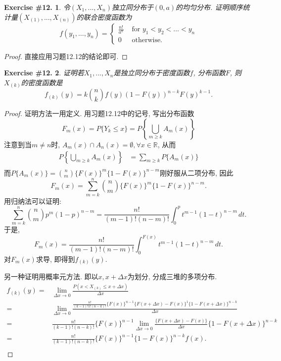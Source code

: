 \documentclass[UTF8, a4paper]{article}
\newtheorem{exercise}{Exercise \#12.}
\begin{document}
\begin{framed}
\begin{exercise}
令\((X_1, ..., X_n)\)独立同分布于\((0,a)\)的均匀分布.
证明顺序统计量\((X_{(1)}, ..., X_{(n)})\)的联合密度函数为
$$
f\left(y_1, \ldots, y_n\right)= \begin{cases}\frac{n!}{a^n} & \text { for } y_1<y_2<\ldots<y_n \\ 0 & \text { otherwise. }\end{cases}
$$
\end{exercise}
\end{framed}

\begin{proof}
直接应用习题12.12的结论即可.
\end{proof}



\begin{framed}
\begin{exercise}
证明若\(X_1, ..., X_n\)是独立同分布于密度函数\(f\), 分布函数\(F\), 则\(X_{(k)}\)的密度函数是
$$
f_{(k)}(y)=k\binom{n}{k} f(y)(1-F(y))^{n-k} F(y)^{k-1}.
$$
\end{exercise}
\end{framed}

\begin{proof}
证明方法一用定义. 用习题12.12中的记号, 写出分布函数
$$
F_m(x) = P\{Y_k \leq x\} = P \left\{\bigcup_{m\geq k} A_m(x)\right\}
$$
注意到当\(m \neq n\)时, \(A_m(x) \cap A_n(x)= \emptyset, \forall x \in \mathbb{R}\), 从而
$$
\begin{aligned}
    P \left\{\bigcup_{m\geq k} A_m(x)\right\} &= \sum_{m\geq k} P\{A_m(x)\} \\
\end{aligned}
$$
而\(P\{A_m(x)\} = \binom{n}{m} \{F(x)\}^m \{1-F(x)\}^{n-m}\)刚好服从二项分布, 因此
$$
F_m(x) = \sum_{m = k}^{n}\binom{n}{m} \{F(x)\}^m \{1-F(x)\}^{n-m}.
$$
用归纳法可以证明:
$$
\sum_{m = k}^{n} \binom{n}{m} p^m(1-p)^{n-m} = \frac{n!}{(m-1)!(n-m)!}\int_{0}^{p}t^{m-1}(1-t)^{n-m} \, dt.
$$
于是, 
$$
F_m(x) = \frac{n!}{(m-1)!(n-m)!}\int_{0}^{F(x)}t^{m-1}(1-t)^{n-m} \, dt.
$$
对\(F_m(x)\)求导, 即得到\(f_{(k)}(y)\).


另一种证明用概率元方法. 即以\(x, x+\Delta x\)为划分, 分成三堆的多项分布.
$$
\begin{aligned}
    f_{(k)}(y) =& \lim_{\Delta x \to 0}\frac{P(x < X_{(k)} \leq x+ \Delta x)}{\Delta x} \\
    =& \lim_{\Delta x \to 0}\frac{\frac{n!}{(k-1)! 1! (n-k)!} \{F(x)\}^{n-1} \{F(x+\Delta x) - F(x)\}^1 \{1 - F(x + \Delta x)\}^{n-k}}{\Delta x} \\
    =& \frac{n!}{(k-1)! (n-k)!} \{F(x)\}^{n-1}\lim_{\Delta x \to 0} \frac{\{F(x+\Delta x) - F(x)\}}{\Delta x} \{1 - F(x + \Delta x)\}^{n-k} \\
    =& \frac{n!}{(k-1)! (n-k)!} \{F(x)\}^{n-1}  \{1 - F(x)\}^{n-k} f(x).  \\
\end{aligned}
$$
\end{proof}
\end{document}
